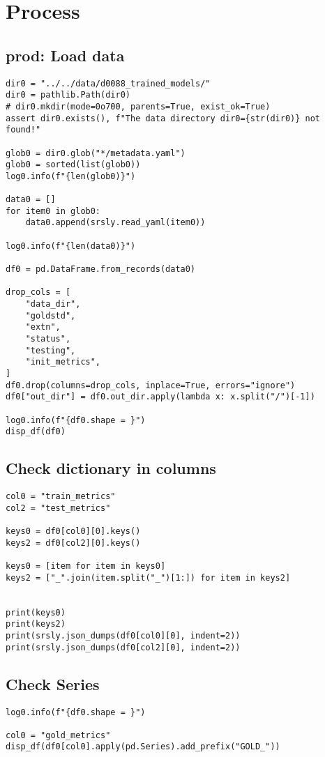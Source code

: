 \documentclass[a4paper,10pt,onecolumn,oneside,openright]{article}
\begin{document}
\section{Process}
\label{sec:org806ea01}
\subsection{prod: Load data}
\label{sec:org086b9bd}
\begin{verbatim}
dir0 = "../../data/d0088_trained_models/"
dir0 = pathlib.Path(dir0)
# dir0.mkdir(mode=0o700, parents=True, exist_ok=True)
assert dir0.exists(), f"The data directory dir0={str(dir0)} not found!"

glob0 = dir0.glob("*/metadata.yaml")
glob0 = sorted(list(glob0))
log0.info(f"{len(glob0)}")

data0 = []
for item0 in glob0:
    data0.append(srsly.read_yaml(item0))

log0.info(f"{len(data0)}")

df0 = pd.DataFrame.from_records(data0)

drop_cols = [
    "data_dir",
    "goldstd",
    "extn",
    "status",
    "testing",
    "init_metrics",
]
df0.drop(columns=drop_cols, inplace=True, errors="ignore")
df0["out_dir"] = df0.out_dir.apply(lambda x: x.split("/")[-1])

log0.info(f"{df0.shape = }")
disp_df(df0)
\end{verbatim}
\subsection{Check dictionary in columns}
\label{sec:orge4c98aa}
\begin{verbatim}
col0 = "train_metrics"
col2 = "test_metrics"

keys0 = df0[col0][0].keys()
keys2 = df0[col2][0].keys()

keys0 = [item for item in keys0]
keys2 = ["_".join(item.split("_")[1:]) for item in keys2]


print(keys0)
print(keys2)
print(srsly.json_dumps(df0[col0][0], indent=2))
print(srsly.json_dumps(df0[col2][0], indent=2))
\end{verbatim}
\subsection{Check Series}
\label{sec:org9fb3e72}
\begin{verbatim}
log0.info(f"{df0.shape = }")

col0 = "gold_metrics"
disp_df(df0[col0].apply(pd.Series).add_prefix("GOLD_"))
\end{verbatim}
\end{document}
